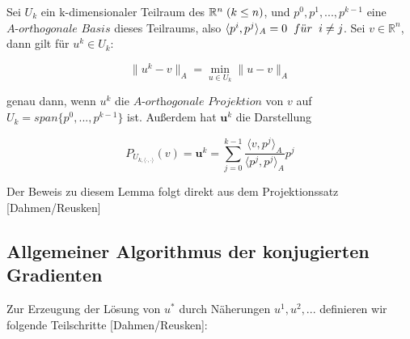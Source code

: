 Sei $U_{k}$ ein k-dimensionaler Teilraum des $\mathbb{R}^{n} \hspace{1mm} (k \le n)$, und $p^{0}, p^{1},...,p^{k-1}$ eine $\textit{A-orthogonale Basis}$ dieses Teilraums, also $\langle p^{i}, p^{j} \rangle _{A} = 0 \hspace{2mm} f\ddot{u}r \hspace{2mm} i \ne j$. Sei $v \in \mathbb{R}^{n}$, dann gilt für $u^{k} \in U_{k}$:

\begin{equation}
\|u^{k} - v\|_{A} = \underset{u \in U_{k}}{\min} \|u - v\|_{A}
\end{equation}

genau dann, wenn $u^{k}$ die $\textit{A-orthogonale Projektion}$ von $v$ auf $U_{k} = span\{p^{0},...,p^{k-1}\}$ ist. Außerdem hat $\textbf{u}^{k}$ die Darstellung

\begin{equation}
P_{U_{k,\langle \cdot,\cdot \rangle}}(v) = \textbf{u}^{k} = \sum_{j=0}^{k-1} \frac {\langle v, p^{j} \rangle _{A}} {\langle p^{j}, p^{j} \rangle _{A}} p^{j}
\end{equation}

Der Beweis zu diesem Lemma folgt direkt aus dem Projektionssatz [Dahmen/Reusken]

\subsection{Allgemeiner Algorithmus der konjugierten Gradienten}\label{ss.Allgemeiner CG-Algorithmus}

Zur Erzeugung der Lösung von $u^{*}$ durch Näherungen $u^{1}, u^{2},...$ definieren wir folgende Teilschritte [Dahmen/Reusken]:

